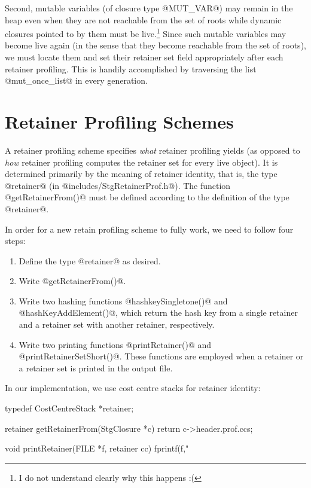 \documentclass{article}
\begin{document}
Second, 
mutable variables (of closure type @MUT_VAR@) may remain in the heap
even when they are not reachable from the set of roots while
dynamic closures pointed to by them must be live.\footnote{I do not 
understand clearly why this happens :(} 
Since such mutable variables may become live again (in the sense that
they become reachable from the set of roots), we must locate them
and set their retainer set field appropriately after each retainer
profiling. This is handily accomplished by traversing the list
@mut_once_list@ in every generation.

\section{Retainer Profiling Schemes}

A retainer profiling scheme specifies \emph{what} retainer profiling
yields (as opposed to \emph{how} retainer profiling computes the retainer
set for every live object).
It is determined primarily by the meaning of retainer identity,
that is, the type @retainer@ (in @includes/StgRetainerProf.h@). 
The function @getRetainerFrom()@ must be defined according to the
definition of the type @retainer@.

In order for a new retain profiling scheme to fully work, we need to follow
four steps:

\begin{enumerate}
\item Define the type @retainer@ as desired.
\item Write @getRetainerFrom()@.
\item Write two hashing functions @hashkeySingletone()@ and 
      @hashKeyAddElement()@, which return the hash key from a single
      retainer and a retainer set with another retainer, respectively.
\item Write two printing functions @printRetainer()@ and 
      @printRetainerSetShort()@.
      These functions are employed when a retainer or a retainer set is
      printed in the output file. 
\end{enumerate}

In our implementation, we use cost centre stacks for retainer identity:

\begin{code}
typedef CostCentreStack *retainer;
\end{code}
\begin{code}
retainer getRetainerFrom(StgClosure *c) { return c->header.prof.ccs; }
\end{code}
\begin{code}
void printRetainer(FILE *f, retainer cc)
{
  fprintf(f,"%
}
\end{code}
\end{document}
